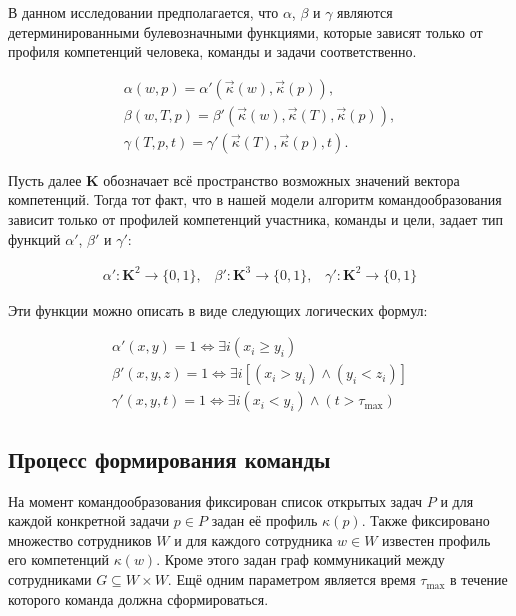 В данном исследовании предполагается, что $\alpha$, $\beta$ и $\gamma$ являются детерминированными булевозначными функциями, которые зависят только от профиля компетенций человека, команды и задачи соответственно. 

\begin{eqnarray} \label{eq:team4}
\alpha(w, p) = \alpha'(\vec{\kappa}(w), \vec{\kappa}(p)),\\
\beta(w, T, p) = \beta'(\vec{\kappa}(w), \vec{\kappa}(T), \vec{\kappa}(p)),\\
\gamma(T, p, t) = \gamma'(\vec{\kappa}(T), \vec{\kappa}(p), t).
\end{eqnarray}

Пусть далее $\textbf{K}$ обозначает всё пространство возможных значений вектора компетенций. Тогда тот факт, что в нашей модели алгоритм командообразования зависит только от профилей компетенций участника, команды и цели, задает тип функций $\alpha'$, $\beta'$ и $\gamma'$:

\begin{eqnarray} \label{eq:team5}
\alpha': {\textbf{K}} ^2 \to \{0, 1\},\;\;\;
\beta': {\textbf{K}} ^3 \to \{0, 1\},\;\;\;
\gamma': {\textbf{K}} ^2 \to \{0, 1\}
\end{eqnarray}

Эти функции можно описать в виде следующих логических формул:

\begin{eqnarray} \label{eq:team6}
\alpha'(x,y)=1 \iff \exists i (x_i \geq y_i) \\
\beta'(x,y,z)=1 \iff \exists i [(x_i > y_i) \wedge (y_i < z_i)]  \\
\gamma'(x,y,t)=1 \iff \exists i (x_i < y_i)  \wedge (t > \tau_{\max})
\end{eqnarray}

\subsection{Процесс формирования команды}
На момент командообразования фиксирован список открытых задач ${P}$ и для каждой конкретной задачи $p\in {P}$ задан её профиль $\kappa(p)$. 
Также фиксировано множество сотрудников $W$ и для каждого сотрудника $w\in W$ известен профиль его компетенций $\kappa(w)$. 
Кроме этого задан граф коммуникаций между сотрудниками $G\subseteq W\times W$. 
Ещё одним параметром является время $\tau_{\max}$ в течение которого команда должна сформироваться.

